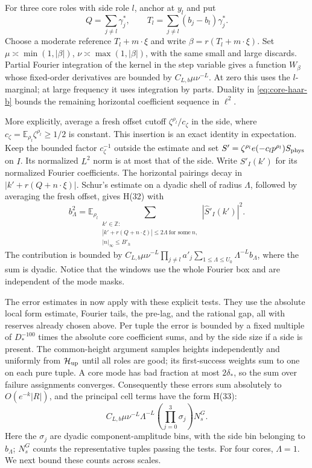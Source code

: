 For three core roles with side role \(l\), anchor at \(y_l\) and put
\[
 Q=\sum_{j\ne l}\gamma_j^*,\qquad
 T_l=\sum_{j\ne l}(b_j-b_l)\gamma_j^*.
\]
Choose a moderate reference \(T_l+m\cdot\xi\) and write
\(\beta=r(T_l+m\cdot\xi)\).  Set
\(\mu\asymp\min(1,|\beta|)\),
\(\nu\asymp\max(1,|\beta|)\), with the same small and large
discards.  Partial Fourier integration of the kernel in the step
variable gives a function \(W_\beta\) whose fixed-order derivatives
are bounded by \(C_{L,b}\mu\nu^{-L}\).  At zero this uses the
\(l\)-marginal; at large frequency it uses integration by parts.
Duality in \eqref{eq:core-haar-b} bounds the remaining horizontal
coefficient sequence in \(\ell^2\).

More explicitly, average a fresh offset cutoff
\(\zeta^{\rho_l}/c_\zeta\) in the side, where
\(c_\zeta=\mathbb E_{\rho_l}\zeta^{\rho_l}\ge1/2\) is constant.
This insertion is an exact identity in expectation.
Keep the bounded factor \(c_\zeta^{-1}\) outside the estimate and set
\(S'=\zeta^{\rho_l}e(-c_lp^{\rho_l})S_{\rm phys}\) on \(I\).
Its normalized \(L^2\) norm is at most that of the side.  Write
\(\widehat S'_I(k')\) for its normalized Fourier coefficients.
The horizontal pairings decay in
\(|k'+r(Q+n\cdot\xi)|\).  Schur's estimate on a dyadic shell
of radius \(\Lambda\), followed by averaging the fresh offset,
gives H(32) with
\begin{equation}\label{eq:side-windows-b}
 b_\Lambda^2=
 \mathbb E_{\rho_l}
 \sum_{\substack{k'\in\mathbb Z:\\
 |k'+r(Q+n\cdot\xi)|\le2\Lambda\ \text{for some}\ n,\\
 |n|_\infty\le B'_h}}
             |\widehat S'_I(k')|^2.
\end{equation}
The contribution is bounded by
\(C_{L,b}\mu\nu^{-L}\prod_{j\ne l}a'_j
\sum_{1\le\Lambda\le U_0}\Lambda^{-L}b_\Lambda\),
where the sum is dyadic.  Notice that the windows use the whole
Fourier box and are independent of the mode masks.

The error estimates in \cite[Section~9.1--9.2]{H} now apply with
these explicit tests.  They use the absolute local form estimate,
Fourier tails, the pre-lag, and the rational gap, all with reserves
already chosen above.  Per tuple the error is bounded by a fixed
multiple of \(D_*^{-100}\) times the absolute core coefficient
sums, and by the side size if a side is present.  The common-height
argument samples heights independently and uniformly from
\(\mathcal H_{\rm up}\) until all roles are good; its first-success
weights sum to one on each pure tuple.  A core mode has bad fraction
at most \(2\delta_*\), so the sum over failure assignments converges.
Consequently these errors sum absolutely to \(O(e^{-k}|R|)\), and
the principal cell terms have the form H(33):
\begin{equation}\label{eq:tested-cell-b}
 C_{L,b}\mu\nu^{-L}\Lambda^{-L}
                       \left(\prod_{j=0}^3\sigma_j\right)N_s^G.
\end{equation}
Here the \(\sigma_j\) are dyadic component-amplitude bins, with
the side bin belonging to \(b_\Lambda\); \(N_s^G\) counts the
representative tuples passing the tests.  For four cores,
\(\Lambda=1\).  We next bound these counts across scales.

